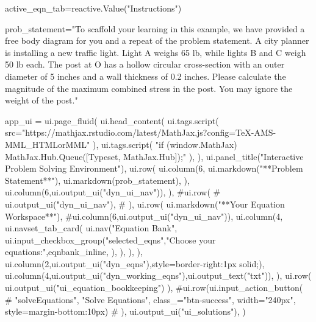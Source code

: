 \documentclass[
  letterpaper,
  DIV=11,
  numbers=noendperiod]{scrreprt}
\newenvironment{Shaded}{\begin{snugshade}}{\end{snugshade}}
\newcommand{\NormalTok}[1]{\textcolor[rgb]{0.00,0.23,0.31}{#1}}
\begin{document}
\begin{Shaded}
\begin{Highlighting}[]
\NormalTok{active\_eqn\_tab=reactive.Value("Instructions")}

\NormalTok{prob\_statement="To scaffold your learning in this example, we have provided a free body diagram for you and a repeat of the problem statement. A city planner is installing a new traffic light. Light A weighs 65 lb, while lights B and C weigh 50 lb each. The post at O has a hollow circular cross{-}section with an outer diameter of 5 inches and a wall thickness of 0.2 inches. Please calculate the magnitude of the maximum combined stress in the post. You may ignore the weight of the post."}

\NormalTok{app\_ui = ui.page\_fluid(}
\NormalTok{    ui.head\_content(}
\NormalTok{        ui.tags.script(}
\NormalTok{            src="https://mathjax.rstudio.com/latest/MathJax.js?config=TeX{-}AMS{-}MML\_HTMLorMML"}
\NormalTok{        ),}
\NormalTok{        ui.tags.script(}
\NormalTok{            "if (window.MathJax) MathJax.Hub.Queue([\textquotesingle{}Typeset\textquotesingle{}, MathJax.Hub]);"}
\NormalTok{        ),}
\NormalTok{    ),}
\NormalTok{    ui.panel\_title("Interactive Problem Solving Environment"),}
\NormalTok{        ui.row(}
\NormalTok{            ui.column(6,}
\NormalTok{                ui.markdown("**Problem Statement**"),}
\NormalTok{                ui.markdown(prob\_statement),}
\NormalTok{                ),}
\NormalTok{            ui.column(6,ui.output\_ui("dyn\_ui\_nav")),}
\NormalTok{            ),}
\NormalTok{        \#ui.row(}
\NormalTok{        \#    ui.output\_ui("dyn\_ui\_nav"),}
\NormalTok{        \#    ),}
\NormalTok{        ui.row(}
\NormalTok{            ui.markdown("**Your Equation Workspace**"),}
\NormalTok{            \#ui.column(6,ui.output\_ui("dyn\_ui\_nav")),}
\NormalTok{            ui.column(4,}
\NormalTok{                ui.navset\_tab\_card(}
\NormalTok{                    ui.nav("Equation Bank",}
\NormalTok{                        ui.input\_checkbox\_group("selected\_eqns","Choose your equations:",eqnbank\_inline,}
\NormalTok{                        ),}
\NormalTok{                    ),}
\NormalTok{                ),}
\NormalTok{            ),}
\NormalTok{            ui.column(2,ui.output\_ui("dyn\_eqns"),style=\textquotesingle{}border{-}right:1px solid;\textquotesingle{}),}
\NormalTok{            ui.column(4,ui.output\_ui("dyn\_working\_eqns"),ui.output\_text("txt")),}
\NormalTok{        ),}
\NormalTok{        ui.row(}
\NormalTok{          ui.output\_ui("ui\_equation\_bookkeeping")}
\NormalTok{        ),}
\NormalTok{        \#ui.row(ui.input\_action\_button(}
\NormalTok{        \#            "solveEquations", "Solve Equations", class\_="btn{-}success", width="240px", style=\textquotesingle{}margin{-}bottom:10px\textquotesingle{})}
\NormalTok{        \#      ),}
\NormalTok{        ui.output\_ui("ui\_solutions"),}
\NormalTok{)}



\end{Highlighting}
\end{Shaded}
\end{document}
